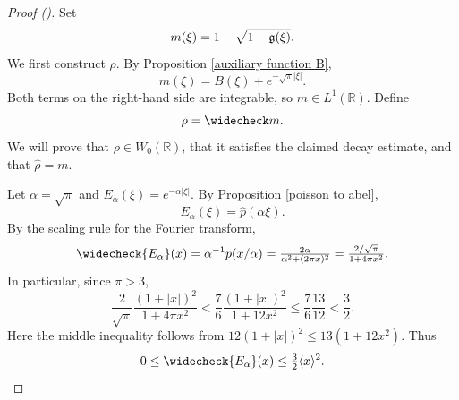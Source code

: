\documentclass[12pt,reqno]{amsart}
\newcommand{\auto}{{({\tiny\faCar})}}
\theoremstyle{plain}
\numberwithin{equation}{section}
\theoremstyle{remark}
\newcommand{\R}{{\mathbb R}}
\begin{document}
\begin{proof}[Proof \auto]
Set
\[
    m(\xi)=1-\sqrt{1-\mathfrak{g}(\xi)}.
\]
We first construct \(\rho\). By Proposition \ref{auxiliary function B},
\[
    m(\xi)=B(\xi)+e^{-\sqrt{\pi}|\xi|}.
\]
Both terms on the right-hand side are integrable, so \(m\in L^1(\R)\). Define
\[
    \rho=\widecheck m.
\]
We will prove that \(\rho\in W_0(\R)\), that it satisfies the claimed decay estimate, and that
\(\widehat\rho=m\).

Let \(\alpha=\sqrt{\pi}\) and \(E_\alpha(\xi)=e^{-\alpha|\xi|}\). By Proposition
\ref{poisson to abel},
\[
    E_\alpha(\xi)=\widehat p(\alpha \xi).
\]
By the scaling rule for the Fourier transform,
\[
    \widecheck{E_\alpha}(x)
    =
    \alpha^{-1}p(x/\alpha)
    =
    \tfrac{2\alpha}{\alpha^2+(2\pi x)^2}
    =
    \tfrac{2/\sqrt{\pi}}{1+4\pi x^2}.
\]
In particular, since $\pi>3$,
\[
\frac{2}{\sqrt\pi}\frac{(1+|x|)^2}{1+4\pi x^2}
<\frac76\frac{(1+|x|)^2}{1+12x^2}
\le\frac76\frac{13}{12}<\frac32.
\]
Here the middle inequality follows from
$12(1+|x|)^2\le13(1+12x^2)$.
Thus
\begin{equation}\label{eq:abel-decay}
    0\le \widecheck{E_\alpha}(x)\le \tfrac32\langle x\rangle^{2}.
\end{equation}


\end{proof}
\end{document}

